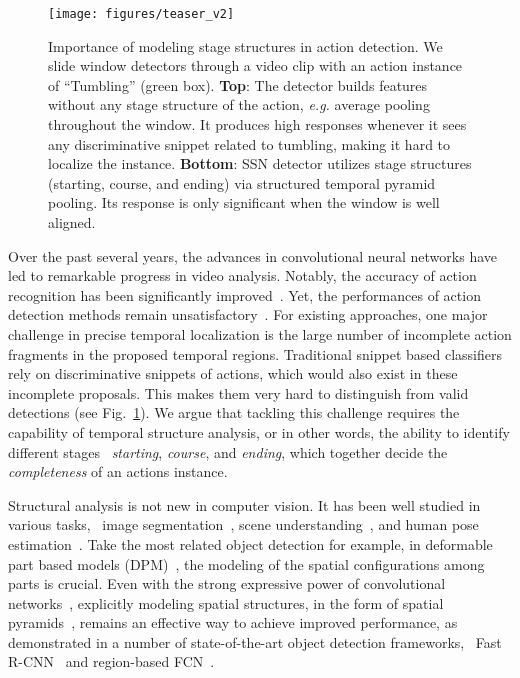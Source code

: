 \documentclass[10pt,twocolumn,letterpaper]{article}
\begin{document}
\begin{figure}
	\centering
	\texttt{[image: figures/teaser\_v2]}
	\caption{
		\small
		Importance of modeling stage structures in action detection.
		We slide window detectors through a video clip with an action instance of ``Tumbling'' (green box). \textbf{Top}: The detector builds features without any stage structure of the action, \emph{e.g.} average pooling throughout the window. It produces high responses whenever it sees any discriminative snippet related to tumbling, making it hard to localize the instance.
		\textbf{Bottom}: SSN detector utilizes stage structures (starting, course, and ending) via structured temporal pyramid pooling. Its response is only significant when the window is well aligned.}
	\label{fig:teaser_curve}
\end{figure}

Over the past several years, the advances in convolutional neural networks
have led to remarkable progress in video analysis. Notably, the accuracy
of action recognition has been significantly
improved~\cite{Simonyan14TwoStream,Tran15C3D,Fernando15Evolution,WangQT15TDD,Wang2016TSN}.
Yet, the performances of action detection methods remain unsatisfactory~\cite{Yuan2016ScorePyramids,Yeung2016FrameGlimpse,DBLP:journals/corr/SinghC16}.
For existing approaches, one major challenge in precise temporal localization is the large number of incomplete action fragments in the proposed temporal regions. 
Traditional snippet based classifiers rely on discriminative snippets of actions, which would also exist in these incomplete proposals. This makes them very hard to distinguish from valid detections (see Fig.~\ref{fig:teaser_curve}).
We argue that tackling this challenge requires the capability of temporal structure analysis,
or in other words, the ability to identify different stages
\eg~\emph{starting}, \emph{course}, and \emph{ending}, which together decide the \emph{completeness} of an actions instance.


Structural analysis is not new in computer vision.
It has been well studied in various tasks,
\eg~image segmentation~\cite{lafferty2001conditional}, scene understanding~\cite{hoiem2008putting}, and human pose estimation~\cite{andriluka2009pictorial}.
Take the most related object detection for example, in deformable part based models (DPM)~\cite{Felzenszwalb2010DPM},
the modeling of the spatial configurations among parts is crucial.
Even with the strong expressive power of convolutional networks~\cite{Girshick2014RCNN},
explicitly modeling spatial structures, in the form of spatial pyramids~\cite{Lazebnik2006Beyond,He2014SPP}, remains an effective way to achieve improved performance, as demonstrated in a number of
state-of-the-art object detection frameworks, \eg~Fast R-CNN~\cite{Girshick2015FRCNN} and region-based FCN~\cite{Li2016RFCN}.
\end{document}
